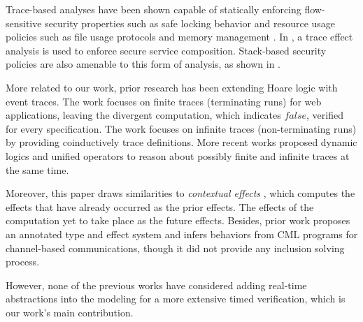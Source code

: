 \documentclass[acmsmall,10pt,review]{acmart}
\newcommand{\code}[1]{{\tt{\ensuremath{\m{#1}}}}}
\newcommand{\m}{\mathit}
\begin{document}
{{{Trace-based analyses have been shown capable of statically enforcing flow-sensitive security properties such as safe locking behavior \cite{DBLP:conf/pldi/FosterTA02} and resource usage policies such as file usage protocols and memory management \cite{DBLP:conf/aplas/MarriottSS03}. In \cite{DBLP:conf/csfw/BartolettiDF05}, a trace effect analysis is used to enforce secure service composition. 
 Stack-based security policies are also amenable to this form of analysis, as shown in \cite{DBLP:conf/aplas/SkalkaS04}. 
 

 

 
More related to our work, prior research has been extending Hoare logic with event traces. The work \cite{DBLP:journals/jsc/MalechaMW11} focuses on finite traces (terminating runs) for web applications, leaving the divergent computation, which indicates \code{false}, verified for every specification. The work \cite{DBLP:conf/esop/NakataU10} focuses on infinite traces (non-terminating runs) by providing coinductively trace definitions. 
More recent works \cite{DBLP:conf/tableaux/BubelDHN15,DBLP:conf/icfem/SongC20} proposed dynamic logics and unified operators to reason about possibly finite and infinite traces at the same time. 

Moreover, this paper draws similarities to \textit{contextual effects} \cite{DBLP:conf/popl/NeamtiuHFP08}, which computes the effects that have already occurred as the prior effects. The effects of the computation yet to take place as the future effects. 
Besides, prior work \cite{DBLP:conf/fase/NielsonAN98} proposes an annotated type and effect system and infers behaviors from CML \cite{DBLP:conf/mcmaster/Reppy93} programs for channel-based communications, though it did not provide any inclusion solving process. 



However, none of the previous works have considered adding real-time abstractions into the modeling for a more extensive timed verification, which is our work's main contribution.



 
%
%
%
%
%
 

}}}
\end{document}
